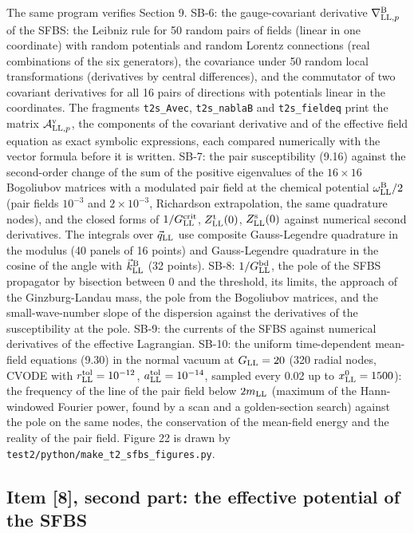 \documentclass[
  10pt,
]{article}
\begin{document}
The same program verifies Section 9. SB-6: the gauge-covariant
derivative \(\nabla^{\rm B}_{{\rm LL},p}\) of the SFBS: the Leibniz rule
for 50 random pairs of fields (linear in one coordinate) with random
potentials and random Lorentz connections (real combinations of the six
generators), the covariance under 50 random local transformations
(derivatives by central differences), and the commutator of two
covariant derivatives for all 16 pairs of directions with potentials
linear in the coordinates. The fragments \texttt{t2s\_Avec},
\texttt{t2s\_nablaB} and \texttt{t2s\_fieldeq} print the matrix
\(\mathcal A^{\rm v}_{{\rm LL},p}\), the components of the covariant
derivative and of the effective field equation as exact symbolic
expressions, each compared numerically with the vector formula before it
is written. SB-7: the pair susceptibility (9.16) against the
second-order change of the sum of the positive eigenvalues of the
\(16\times16\) Bogoliubov matrices with a modulated pair field at the
chemical potential \(\omega^{\rm B}_{\rm LL}/2\) (pair fields
\(10^{-3}\) and \(2\times10^{-3}\), Richardson extrapolation, the same
quadrature nodes), and the closed forms of \(1/G^{\rm crit}_{\rm LL}\),
\(Z^{\rm t}_{\rm LL}(0)\), \(Z^{\rm s}_{\rm LL}(0)\) against numerical
second derivatives. The integrals over \(\vec q_{\rm LL}\) use composite
Gauss-Legendre quadrature in the modulus (40 panels of 16 points) and
Gauss-Legendre quadrature in the cosine of the angle with
\(\vec k^{\rm B}_{\rm LL}\) (32 points). SB-8:
\(1/G^{\rm bd}_{\rm LL}\), the pole of the SFBS propagator by bisection
between 0 and the threshold, its limits, the approach of the
Ginzburg-Landau mass, the pole from the Bogoliubov matrices, and the
small-wave-number slope of the dispersion against the derivatives of the
susceptibility at the pole. SB-9: the currents of the SFBS against
numerical derivatives of the effective Lagrangian. SB-10: the uniform
time-dependent mean-field equations (9.30) in the normal vacuum at
\(G_{\rm LL}=20\) (320 radial nodes, CVODE with
\(r^{\rm tol}_{\rm LL}=10^{-12}\), \(a^{\rm tol}_{\rm LL}=10^{-14}\),
sampled every 0.02 up to \(x^0_{\rm LL}=1500\)): the frequency of the
line of the pair field below \(2m_{\rm LL}\) (maximum of the
Hann-windowed Fourier power, found by a scan and a golden-section
search) against the pole on the same nodes, the conservation of the
mean-field energy and the reality of the pair field. Figure 22 is drawn
by \texttt{test2/python/make\_t2\_sfbs\_figures.py}.

\hypertarget{item-8-second-part-the-effective-potential-of-the-sfbs}{%
\subsection{Item {[}8{]}, second part: the effective potential of the
SFBS}\label{item-8-second-part-the-effective-potential-of-the-sfbs}}
\end{document}
